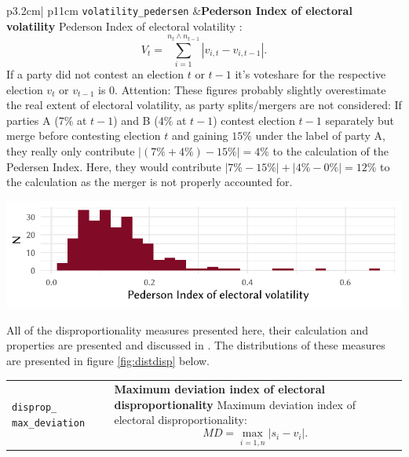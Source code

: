 \documentclass[
]{scrartcl}
\begin{document}
\begin{longtable}{p{3.2cm}| p{11cm}}
\texttt{volatility\_pedersen} &\textbf{Pederson Index of electoral volatility}\newline 
Pederson Index of electoral volatility \parencite{pedersenDynamicsEuropeanParty1979}:
           \begin{equation} V_t = \sum_{i = 1}^{n_t \wedge n_{t-1}}|v_{i,t} - v_{i,t-1}|.  \end{equation} 
           If a party did not contest an election $t$ or $t-1$ it's voteshare for the respective election $v_t$ or $v_{t-1}$ is $0$.
           Attention: These figures probably slightly overestimate the real extent of electoral volatility, as party splits/mergers are not considered: If parties A ($7\%$ at $t-1$) and B ($4\%$ at $t-1$) contest election $t-1$ separately but merge before contesting election $t$ and gaining $15\%$ under the label of party A, they really only contribute $|(7\% + 4\%) - 15\%| = 4\%$ to the calculation of the Pedersen Index. Here, they would contribute $|7\% - 15\%| + |4\% - 0\%| = 12\%$ to the calculation as the merger is not properly accounted for.



\hspace*{.25cm}
\begin{minipage}[t]{\linewidth }
\vspace{0pt}
\includegraphics[width = \linewidth]{cbfiles/pedersenplot.pdf}
\end{minipage}



\end{longtable}

All of the disproportionality measures presented here, their calculation
and properties are presented and discussed in
\textcite{karpovMeasurementDisproportionalityProportional2008}. The
distributions of these measures are presented in figure
\ref{fig:distdisp} below.

\begin{longtable}{p{3.2cm}| p{11cm}}
\texttt{disprop\_
max\_deviation} &\textbf{Maximum deviation index of electoral disproportionality}\newline 
Maximum deviation index of electoral disproportionality:
           \begin{equation}MD = \max_{i=\overline{1,n}} |s_i - v_i|.\end{equation}
\end{longtable}
\end{document}
